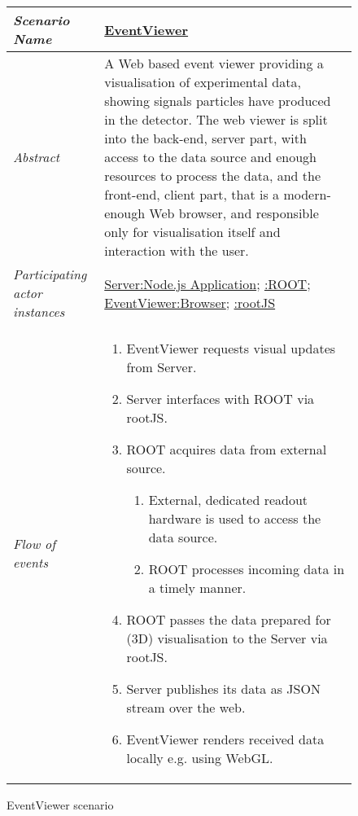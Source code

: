 \pagebreak[4]

\begin{figure}[htb]
	\centering
	\begin{longtable}{p{3cm} @{\hskip 1cm} p{12cm}}
		\hline
		\textit{Scenario Name} & \underline{EventViewer}\\
		\hline
		\textit{Abstract} &
		A Web based event viewer providing a visualisation of experimental data, showing signals particles have produced in the detector.
		The web viewer is split into the back-end, server part, with access to
	    the data source and enough resources to process the data, and the front-end, client part, that is a modern-enough Web browser, and responsible only for visualisation itself and interaction with the user.
		\\
		\hline
		\textit{Participating actor instances} & 
		\underline{Server:Node.js Application}; \underline{:ROOT}; \underline{EventViewer:Browser}; \underline{:rootJS}\\
		\hline
		\textit{Flow of events} &
		\begin{enumerate}
			\item EventViewer requests visual updates from Server.
			\item Server interfaces with ROOT via rootJS.
			\item ROOT acquires data from external source.
			\begin{enumerate}
					\item External, dedicated readout hardware is used to access the data source.
					\item ROOT processes incoming data in a timely manner.
			\end{enumerate}
			\item ROOT passes the data prepared for (3D) visualisation to the Server via rootJS.
			\item Server publishes its data as JSON stream over the web.
			\item EventViewer renders received data locally e.g. using WebGL.
		\end{enumerate}
		\\
		\hline
	\end{longtable}
	\caption{EventViewer scenario}
\end{figure}
